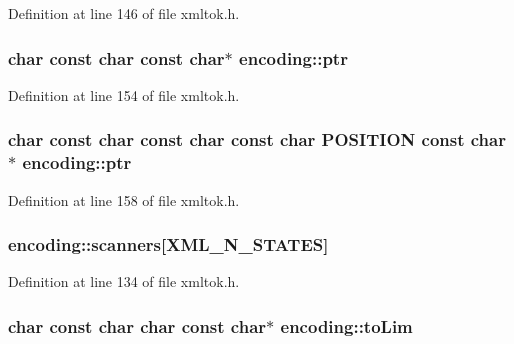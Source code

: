 Definition at line 146 of file xmltok.\+h.

\subsubsection[{\texorpdfstring{ptr}{ptr}}]{ char {\bf const} char {\bf const} char$\ast$ encoding\+::ptr}\hypertarget{structencoding_aa4291770220296dccdae2caa59d3d10f}{}\label{structencoding_aa4291770220296dccdae2caa59d3d10f}


Definition at line 154 of file xmltok.\+h.

\subsubsection[{\texorpdfstring{ptr}{ptr}}]{ char {\bf const} char {\bf const} char {\bf const} char {\bf P\+O\+S\+I\+T\+I\+ON} {\bf const} char$\ast$ encoding\+::ptr}\hypertarget{structencoding_ab8e153eed61327bf8fa793f53ee59e0f}{}\label{structencoding_ab8e153eed61327bf8fa793f53ee59e0f}


Definition at line 158 of file xmltok.\+h.

\subsubsection[{\texorpdfstring{scanners}{scanners}}]{ encoding\+::scanners\mbox{[}{\bf X\+M\+L\+\_\+\+N\+\_\+\+S\+T\+A\+T\+ES}\mbox{]}}\hypertarget{structencoding_af15c935d0343018b21e64a166532990e}{}\label{structencoding_af15c935d0343018b21e64a166532990e}


Definition at line 134 of file xmltok.\+h.

\subsubsection[{\texorpdfstring{to\+Lim}{toLim}}]{ char {\bf const} char char {\bf const} char$\ast$ encoding\+::to\+Lim}\hypertarget{structencoding_ad121e4388d5369e25c2d8e5f2d0bc036}{}\label{structencoding_ad121e4388d5369e25c2d8e5f2d0bc036}


